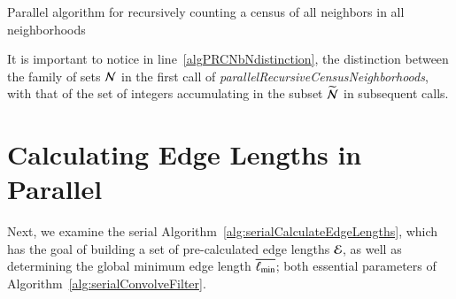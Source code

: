 \begin{algorithm}[ht]
	\DontPrintSemicolon


	\bigskip
\nl	{}

	\bigskip
\nl	{}
	\caption{Parallel algorithm for recursively counting a census of all neighbors in all neighborhoods \label{alg:parallelRecursiveCensusNeighborhoods}}
\end{algorithm}%
%
%

It is important to notice in line~\ref{algPRCNbNdistinction}, the distinction between the family of sets $\mathcal{N}$ in the first call of \textit{parallelRecursiveCensusNeighborhoods}, with that of the set of integers accumulating in the subset $\widetilde{\mathcal{N}}$ in subsequent calls.

%
%
%
%
\section{Calculating Edge Lengths in Parallel}
\label{ch6sCELP}
Next, we examine the serial Algorithm~\ref{alg:serialCalculateEdgeLengths}, which has the goal of building a set of pre-calculated edge lengths $\mathcal{E}$, as well as determining the global minimum edge length $\overline{\ell_\text{min}}$; both essential parameters of Algorithm~\ref{alg:serialConvolveFilter}. 

